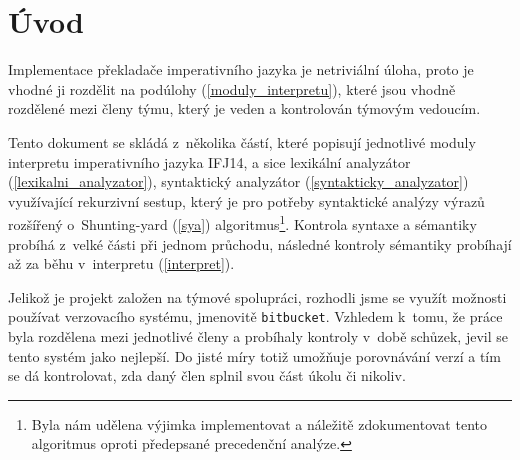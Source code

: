\documentclass[12pt,a4paper,titlepage,final]{article}
\begin{document}

\def\author{Antonín Marko}
\def\email{xmarko07@stud.fit.vutbr.cz}
\def\projname{Implementace interpretu imperativního jazyka IFJ14}



\pagestyle{plain}
\setcounter{page}{1}
\tableofcontents

\newpage
\pagestyle{plain}
\setcounter{page}{1}

\section{Úvod} \label{uvod}
Implementace překladače imperativního jazyka je netriviální úloha, proto je
vhodné ji rozdělit na podúlohy (\ref{moduly_interpretu}), které jsou vhodně
rozdělené mezi členy týmu, který je veden a kontrolován týmovým vedoucím.

Tento dokument se skládá z~několika částí, které popisují jednotlivé moduly
interpretu imperativního jazyka IFJ14, a sice lexikální analyzátor
(\ref{lexikalni_analyzator}), syntaktický analyzátor (\ref{syntakticky_analyzator})
využívající rekurzivní sestup, který je pro potřeby syntaktické
analýzy výrazů rozšířený o~Shunting-yard (\ref{sya}) algoritmus\footnote{Byla nám
udělena výjimka implementovat a náležitě zdokumentovat tento algoritmus oproti předepsané
precedenční analýze.}. Kontrola syntaxe a sémantiky probíhá z~velké části při jednom
průchodu, následné kontroly sémantiky probíhají až za běhu v~interpretu (\ref{interpret}).

Jelikož je projekt založen na týmové spolupráci, rozhodli jsme se využít možnosti používat verzovacího systému, jmenovitě \verb|bitbucket|. Vzhledem k~tomu, že práce byla rozdělena mezi jednotlivé členy a probíhaly kontroly v~době schůzek, jevil se tento systém jako nejlepší. Do jisté míry totiž umožňuje porovnávání verzí a tím se dá kontrolovat, zda daný člen splnil svou část úkolu či nikoliv.
\end{document}
